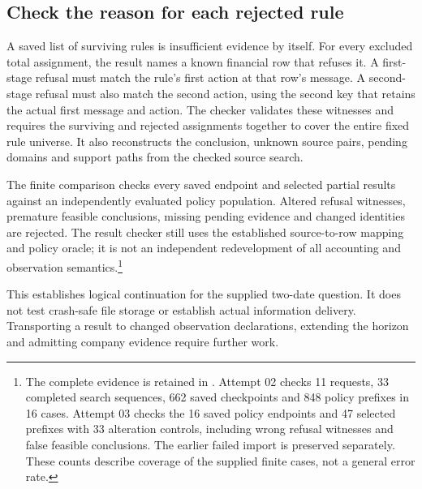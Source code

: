 \subsection{Check the reason for each rejected rule}

A saved list of surviving rules is insufficient evidence by itself. For every excluded total assignment, the result names a known financial row that refuses it. A first-stage refusal must match the rule's first action at that row's message. A second-stage refusal must also match the second action, using the second key that retains the actual first message and action. The checker validates these witnesses and requires the surviving and rejected assignments together to cover the entire fixed rule universe. It also reconstructs the conclusion, unknown source pairs, pending domains and support paths from the checked source search.

The finite comparison checks every saved endpoint and selected partial results against an independently evaluated policy population. Altered refusal witnesses, premature feasible conclusions, missing pending evidence and changed identities are rejected. The result checker still uses the established source-to-row mapping and policy oracle; it is not an independent redevelopment of all accounting and observation semantics.\footnote{The complete evidence is retained in . Attempt 02 checks 11 requests, 33 completed search sequences, 662 saved checkpoints and 848 policy prefixes in 16 cases. Attempt 03 checks the 16 saved policy endpoints and 47 selected prefixes with 33 alteration controls, including wrong refusal witnesses and false feasible conclusions. The earlier failed import is preserved separately. These counts describe coverage of the supplied finite cases, not a general error rate.}

This establishes logical continuation for the supplied two-date question. It does not test crash-safe file storage or establish actual information delivery. Transporting a result to changed observation declarations, extending the horizon and admitting company evidence require further work.
